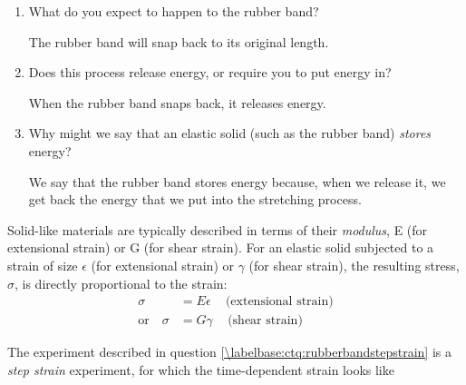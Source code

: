 \begin{activity}
\begin{ctqs}
		\begin{enumerate}
			
			\item What do you expect to happen to the rubber band?
			
				\begin{solution}[1in]
					The rubber band will snap back to its original length.
				\end{solution}
			
			\item Does this process release energy, or require you to put energy in?
			
				\begin{solution}[1in]
					When the rubber band snaps back, it releases energy.
				\end{solution}
			
			\item Why might we say that an elastic solid (such as the rubber band) \emph{stores} energy?
			
				\begin{solution}[1in]
					We say that the rubber band stores energy because, when we release it, we get back the energy that we put into the stretching process.
				\end{solution}
			
		\end{enumerate}
	
\end{ctqs}

\begin{infobox}

	Solid-like materials are typically described in terms of their \emph{modulus}, E (for extensional strain) or G (for shear strain).  For an elastic solid subjected to a strain of size $\epsilon$ (for extensional strain) or $\gamma$ (for shear strain), the resulting stress, $\sigma$, is directly proportional to the strain:
	\begin{align*}
		\sigma &= E\epsilon\,\,\,\,\,\,\,\text{(extensional strain)}\\
		\text{or}\,\,\,\,\,\,\sigma &= G\gamma\,\,\,\,\,\,\,\text{(shear strain)}
	\end{align*}
	
\end{infobox}

\begin{ctqs}
	\question The experiment described in question \ref{\labelbase:ctq:rubberbandstepstrain} is a \emph{step strain} experiment, for which the time-dependent strain looks like
	

\end{ctqs}
\end{activity}

